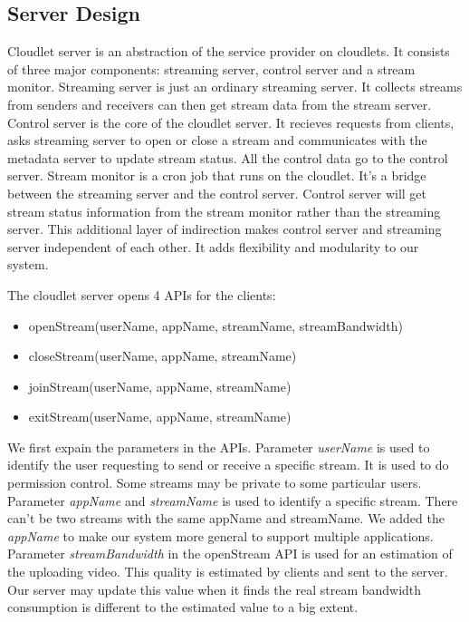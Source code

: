 \documentclass[letterpaper,twocolumn,10pt]{article}
\begin{document}
\subsection{Server Design}
Cloudlet server is an abstraction of the service provider on cloudlets. It consists of three major components: streaming server, control server and a stream monitor. Streaming server is just an ordinary streaming server. It collects streams from senders and receivers can then get stream data from the stream server. Control server is the core of the cloudlet server. It recieves requests from clients, asks streaming server to open or close a stream and communicates with the metadata server to update stream status. All the control data go to the control server. Stream monitor is a cron job that runs on the cloudlet. It's a bridge between the streaming server and the control server. Control server will get stream status information from the stream monitor rather than the streaming server. This additional layer of indirection makes control server and streaming server independent of each other. It adds flexibility and modularity to our system.

The cloudlet server opens 4 APIs for the clients:

\begin{itemize}
  \item openStream(userName, appName, streamName, streamBandwidth)
  \item closeStream(userName, appName, streamName)
  \item joinStream(userName, appName, streamName)
  \item exitStream(userName, appName, streamName)
\end{itemize}

We first expain the parameters in the APIs. Parameter \emph{userName} is used to identify the user requesting to send or receive a specific stream. It is used to do permission control. Some streams may be private to some particular users. Parameter \emph{appName} and \emph{streamName} is used to identify a specific stream. There can't be two streams with the same appName and streamName. We added the \emph{appName} to make our system more general to support multiple applications. Parameter \emph{streamBandwidth} in the openStream API is used for an estimation of the uploading video. This quality is estimated by clients and sent to the server. Our server may update this value when it finds the real stream bandwidth consumption is different to the estimated value to a big extent.
\end{document}
